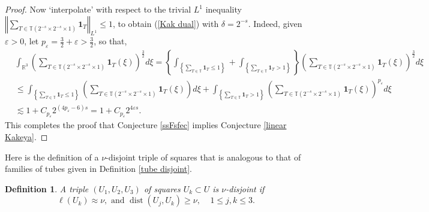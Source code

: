 \documentclass{amsart}%
\theoremstyle{plain}
\newtheorem{definition}[theorem]{Definition}
\numberwithin{equation}{section}
\begin{document}
\begin{proof}
Now `interpolate' with respect to the trivial $L^{1}$ inequality $\left\Vert
\sum_{T\in\mathbb{T}\left(  2^{-s}\times2^{-s}\times1\right)  }\mathbf{1}%
_{T}\right\Vert _{L^{1}}\leq1$, to obtain (\ref{Kak dual}) with $\delta
=2^{-s}$. Indeed, given $\varepsilon>0$, let $p_{\varepsilon}=\frac{3}%
{2}+\varepsilon>\frac{3}{2}$, so that,%
\begin{align}
&  \int_{\mathbb{R}^{3}}\left(  \sum_{T\in\mathbb{T}\left(  2^{-s}\times
2^{-s}\times1\right)  }\mathbf{1}_{T}\left(  \xi\right)  \right)  ^{\frac
{3}{2}}d\xi=\left\{  \int_{\left\{  \sum_{T\in\mathbb{T}}\mathbf{1}_{T}%
\leq1\right\}  }+\int_{\left\{  \sum_{T\in\mathbb{T}}\mathbf{1}_{T}>1\right\}
}\right\}  \left(  \sum_{T\in\mathbb{T}\left(  2^{-s}\times2^{-s}%
\times1\right)  }\mathbf{1}_{T}\left(  \xi\right)  \right)  ^{\frac{3}{2}}%
d\xi\label{interp}\\
&  \leq\int_{\left\{  \sum_{T\in\mathbb{T}}\mathbf{1}_{T}\leq1\right\}
}\left(  \sum_{T\in\mathbb{T}\left(  2^{-s}\times2^{-s}\times1\right)
}\mathbf{1}_{T}\left(  \xi\right)  \right)  d\xi+\int_{\left\{  \sum
_{T\in\mathbb{T}}\mathbf{1}_{T}>1\right\}  }\left(  \sum_{T\in\mathbb{T}%
\left(  2^{-s}\times2^{-s}\times1\right)  }\mathbf{1}_{T}\left(  \xi\right)
\right)  ^{p_{\varepsilon}}d\xi\nonumber\\
&  \lesssim1+C_{p_{\varepsilon}}2^{\left(  4p_{\varepsilon}-6\right)
s}=1+C_{p_{\varepsilon}}2^{4\varepsilon s}.\nonumber
\end{align}
This completes the proof that Conjecture \ref{ssFsfec} implies Conjecture
\ref{linear Kakeya}.
\end{proof}

Here is the definition of a $\nu$-disjoint triple of squares that is analogous
to that of families of tubes given in Definition \ref{tube disjoint}.

\begin{definition}
A triple $\left(  U_{1},U_{2},U_{3}\right)  $ of squares $U_{k}\subset U$ is
$\nu$\emph{-disjoint} if%
\begin{equation}
\ell\left(  U_{k}\right)  \approx\nu,\text{ and }\operatorname*{dist}\left(
U_{j},U_{k}\right)  \geq\nu,\ \ \ \ \ 1\leq j,k\leq3. \label{nu disjoint'}%
\end{equation}

\end{definition}
\end{document}
